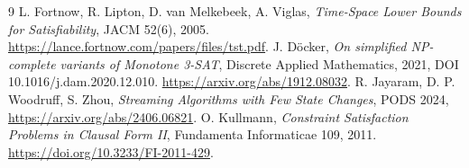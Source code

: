 \documentclass[11pt]{article}
\begin{document}
\begin{thebibliography}{9}
 L. Fortnow, R. Lipton, D. van Melkebeek, A. Viglas,
\emph{Time-Space Lower Bounds for Satisfiability}, JACM 52(6), 2005.
\url{https://lance.fortnow.com/papers/files/tst.pdf}.
 J. D\"ocker, \emph{On simplified NP-complete
variants of Monotone 3-SAT}, Discrete Applied Mathematics, 2021,
DOI 10.1016/j.dam.2020.12.010.
\url{https://arxiv.org/abs/1912.08032}.
 R. Jayaram, D. P. Woodruff, S. Zhou,
\emph{Streaming Algorithms with Few State Changes}, PODS 2024,
\url{https://arxiv.org/abs/2406.06821}.
 O. Kullmann,
\emph{Constraint Satisfaction Problems in Clausal Form II},
Fundamenta Informaticae 109, 2011.
\url{https://doi.org/10.3233/FI-2011-429}.
\end{thebibliography}
\end{document}
